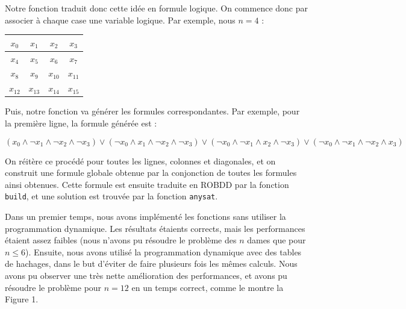 \documentclass[a4paper,11pt]{article}
\begin{document}
	Notre fonction traduit donc cette idée en formule logique. On commence donc par associer à chaque case une variable logique. Par exemple, nous $n = 4$ :
	
	\begin{center}
	\begin{tabular}{|*{4}{c|}}
	
            \hline
            $x_0$ & $x_1$ & $x_2$ & $x_3$ \\
            \hline
            $x_4$ & $x_5$ & $x_6$ & $x_7$ \\
            \hline
            $x_8$ & $x_9$ & $x_{10}$ & $x_{11}$ \\
            \hline
            $x_{12}$ & $x_{13}$ & $x_{14}$ & $x_{15}$ \\
            \hline
        \end{tabular}
        \end{center}
        
        Puis, notre fonction va générer les formules correspondantes. Par exemple, pour la première ligne, la formule générée est :
        
        $$(x_0 \land \neg x_1 \land \neg x_2 \land \neg x_3) \lor (\neg x_0 \land x_1 \land \neg x_2 \land \neg x_3) \lor (\neg x_0 \land \neg x_1 \land x_2 \land \neg x_3) \lor (\neg x_0 \land \neg x_1 \land \neg x_2 \land x_3)$$
        
        On réitère ce procédé pour toutes les lignes, colonnes et diagonales, et on construit une formule globale obtenue par la conjonction de toutes les formules ainsi obtenues. Cette formule est ensuite traduite en ROBDD par la fonction \texttt{build}, et une solution est trouvée par la fonction \texttt{anysat}.
	
	Dans un premier temps, nous avons implémenté les fonctions sans utiliser la programmation dynamique. Les résultats étaients corrects, mais les performances
	étaient assez faibles (nous n'avons pu résoudre le problème des $n$ dames que pour $n \leq 6$).
        Ensuite, nous avons utilisé la programmation dynamique avec des tables de hachages, dans le but d'éviter de faire plusieurs fois les mêmes calculs. Nous avons pu observer une très nette amélioration des performances, et avons pu résoudre le problème pour $n = 12$ en un temps correct, comme le montre la Figure 1.
        
\end{document}
